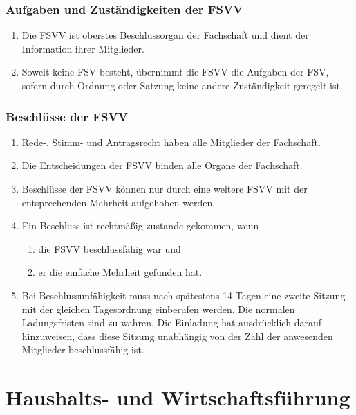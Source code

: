 \documentclass{article}
\begin{document}
\section{Aufgaben und Zuständigkeiten der FSVV}
\begin{enumerate}[(1)]
    \item Die FSVV ist oberstes Beschlussorgan der Fachschaft und dient der Information ihrer Mitglieder.
	\item Soweit keine FSV besteht, übernimmt die FSVV die Aufgaben der FSV, sofern durch Ordnung oder Satzung keine andere Zuständigkeit geregelt ist.
\end{enumerate}

\section{Beschlüsse der FSVV}

\begin{enumerate}[(1)]
	\item Rede-, Stimm- und Antragsrecht haben alle Mitglieder der Fachschaft.
	\item Die Entscheidungen der FSVV binden alle Organe der Fachschaft. 
	\item Beschlüsse der FSVV können nur durch eine weitere FSVV mit der entsprechenden Mehrheit aufgehoben werden.
	\item Ein Beschluss ist rechtmäßig zustande gekommen, wenn
	\begin{enumerate}[1.]
		\item die FSVV beschlussfähig war und
		\item er die einfache Mehrheit gefunden hat.
	\end{enumerate}
	\item Bei Beschlussunfähigkeit muss nach spätestens 14 Tagen eine zweite Sitzung mit der gleichen Tagesordnung einberufen werden. Die normalen Ladungsfristen sind zu wahren. Die Einladung hat ausdrücklich darauf hinzuweisen, dass diese Sitzung unabhängig von der Zahl der anwesenden Mitglieder beschlussfähig ist.
\end{enumerate}

\part{Haushalts- und Wirtschaftsführung}
\end{document}
